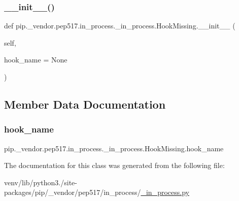 \subsubsection{\texorpdfstring{\+\_\+\+\_\+init\+\_\+\+\_\+()}{\_\_init\_\_()}}
{\footnotesize\ttfamily def pip.\+\_\+vendor.\+pep517.\+in\+\_\+process.\+\_\+in\+\_\+process.\+Hook\+Missing.\+\_\+\+\_\+init\+\_\+\+\_\+ (\begin{DoxyParamCaption}\item[{}]{self,  }\item[{}]{hook\+\_\+name = {\ttfamily None} }\end{DoxyParamCaption})}



\subsection{Member Data Documentation}
\mbox{\label{classpip_1_1__vendor_1_1pep517_1_1in__process_1_1__in__process_1_1HookMissing_a2c9b755d0d59681621d7233832050cde}} 
\subsubsection{\texorpdfstring{hook\+\_\+name}{hook\_name}}
{\footnotesize\ttfamily pip.\+\_\+vendor.\+pep517.\+in\+\_\+process.\+\_\+in\+\_\+process.\+Hook\+Missing.\+hook\+\_\+name}



The documentation for this class was generated from the following file\+:\begin{DoxyCompactItemize}
\item 
venv/lib/python3./site-\/packages/pip/\+\_\+vendor/pep517/in\+\_\+process/\hyperlink{__in__process_8py}{\+\_\+in\+\_\+process.\+py}\end{DoxyCompactItemize}
